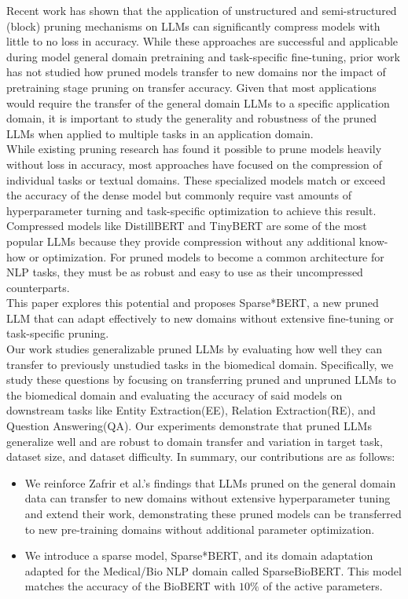 Recent work \cite{Zafrir2021PruneOF} \cite{Kurti2022TheOB} has shown that the application of unstructured and semi-structured (block) pruning mechanisms on LLMs can significantly compress models with little to no loss in accuracy. While these approaches are successful and applicable during model general domain pretraining and task-specific fine-tuning, prior work has not studied how pruned models transfer to new domains nor the impact of pretraining stage pruning on transfer accuracy. Given that most applications would require the transfer of the general domain LLMs to a specific application domain, it is important to study the generality and robustness of the pruned LLMs when applied to multiple tasks in an application domain.  \\
While existing pruning research has found it possible to prune models heavily without loss in accuracy, most approaches have focused on the compression of individual tasks or textual domains. These specialized models match or exceed the accuracy of the dense model but commonly require vast amounts of hyperparameter turning and task-specific optimization to achieve this result. Compressed models like DistillBERT \cite{Sanh2019DistilBERTAD} and TinyBERT \cite{Jiao2020TinyBERTDB} are some of the most popular LLMs because they provide compression without any additional know-how or optimization. For pruned models to become a common architecture for NLP tasks, they must be as robust and easy to use as their uncompressed counterparts. \\
This paper explores this potential and proposes Sparse*BERT, a new pruned LLM that can adapt effectively to new domains without extensive fine-tuning or task-specific pruning.\\
Our work studies generalizable pruned LLMs by evaluating how well they can transfer to previously unstudied tasks in the biomedical domain.
Specifically, we study these questions by focusing on transferring pruned and unpruned LLMs to the biomedical domain and evaluating the accuracy of said models on downstream tasks like Entity Extraction(EE), Relation Extraction(RE), and Question Answering(QA). Our experiments demonstrate that pruned LLMs generalize well and are robust to domain transfer and variation in target task, dataset size, and dataset difficulty. In summary, our contributions are as follows:
\begin{itemize} 
\item We reinforce Zafrir et al.'s findings that LLMs pruned on the general domain data can transfer to new domains without extensive hyperparameter tuning and extend their work, demonstrating these pruned models can be transferred to new pre-training domains without additional parameter optimization.
\item We introduce a sparse model, Sparse*BERT, and its domain adaptation adapted for the Medical/Bio NLP domain called SparseBioBERT. This model matches the accuracy of the BioBERT with $10\%$ of the active parameters.
\end{itemize}
